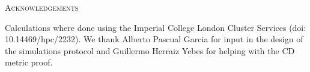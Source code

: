 \documentclass[12pt,letterpaper]{article}
\renewcommand{\section}[1]{%
\bigskip
\begin{center}
\begin{Large}
\normalfont\scshape #1
\medskip
\end{Large}
\end{center}}
\begin{document}
\section{Acknowledgements}
Calculations where done using the Imperial College London Cluster Services (doi: 10.14469/hpc/2232).
We thank Alberto Pascual Garcia for input in the design of the simulations protocol and Guillermo Herraiz Yebes for helping with the CD metric proof.






\end{document}
